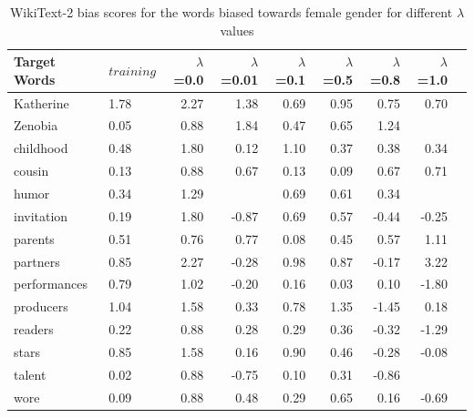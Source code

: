 \documentclass[11pt,a4paper]{article}
\begin{document}
\begin{table}[t]
\small
\centering
    \begin{tabular}{|l|l|r|r|r|r|r|r|r|}
     \toprule
     
    \textbf{Target Words}  & \textbf{$training$} & \textbf{$\lambda$}{=0.0}  & 
      \textbf{$\lambda$}{=0.01}  &
    \textbf{$\lambda$}{=0.1}& \textbf{$\lambda$}{=0.5} & \textbf{$\lambda$}{=0.8} & \textbf{$\lambda$}{=1.0}   \\
      \midrule

Katherine    & 1.78 & 2.27 & 1.38  & 0.69 & 0.95 & 0.75  & 0.70  \\
Zenobia      & 0.05 & 0.88 & 1.84  & 0.47 & 0.65 & 1.24  &       \\
childhood    & 0.48 & 1.80 & 0.12  & 1.10 & 0.37 & 0.38  & 0.34  \\
cousin       & 0.13 & 0.88 & 0.67  & 0.13 & 0.09 & 0.67  & 0.71  \\
humor        & 0.34 & 1.29 &       & 0.69 & 0.61 & 0.34  &       \\
invitation   & 0.19 & 1.80 & -0.87 & 0.69 & 0.57 & -0.44 & -0.25 \\
parents      & 0.51 & 0.76 & 0.77  & 0.08 & 0.45 & 0.57  & 1.11  \\
partners     & 0.85 & 2.27 & -0.28 & 0.98 & 0.87 & -0.17 & 3.22  \\
performances & 0.79 & 1.02 & -0.20 & 0.16 & 0.03 & 0.10  & -1.80 \\
producers    & 1.04 & 1.58 & 0.33  & 0.78 & 1.35 & -1.45 & 0.18  \\
readers      & 0.22 & 0.88 & 0.28  & 0.29 & 0.36 & -0.32 & -1.29 \\
stars        & 0.85 & 1.58 & 0.16  & 0.90 & 0.46 & -0.28 & -0.08 \\
talent       & 0.02 & 0.88 & -0.75 & 0.10 & 0.31 & -0.86 &       \\
wore         & 0.09 & 0.88 & 0.48  & 0.29 & 0.65 & 0.16  & -0.69\\

 \bottomrule
    \end{tabular}
    \caption{WikiText-2 bias scores for the words biased towards female gender for  different $\lambda$  values}
    \label{tab:wf}
\end{table}
\end{document}
